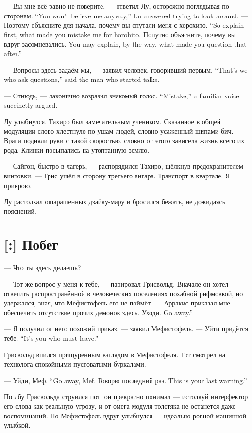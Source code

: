 {--- Вы мне всё равно не поверите, --- ответил Лу, осторожно поглядывая по сторонам.}
{``You won't believe me anyway,'' Lu answered trying to look around.}
{--- Поэтому объясните для начала, почему вы спутали меня с хорохито.}
{``So explain first, what made you mistake me for horohito.}
{Попутно объясните, почему вы вдруг засомневались.}
{You may explain, by the way, what made you question that after.''}

{--- Вопросы здесь задаём мы, --- заявил человек, говоривший первым.}
{``That's we who ask questions,'' said the man who started talks.}

{--- Отнюдь, --- лаконично возразил знакомый голос.}
{``Mistake,'' a familiar voice succinctly argued.}

Лу улыбнулся.
Тахиро был замечательным учеником.
Сказанное в общей модуляции слово хлестнуло по ушам людей, словно усаженный шипами бич.
Враги подняли руки с такой скоростью, словно от этого зависела жизнь всего их рода.
Клинки посыпались на утоптанную землю.

--- Сайгон, быстро в лагерь, --- распорядился Тахиро, щёлкнув предохранителем винтовки.
--- Грис ушёл в сторону третьего ангара.
Транспорт в квартале.
Я прикрою.

Лу растолкал ошарашенных дзайку-мару и бросился бежать, не дожидаясь пояснений.

\section{[:] Побег}

\textspace

--- Что ты здесь делаешь?

--- Тот же вопрос у меня к тебе, --- парировал Грисвольд.
Вначале он хотел ответить распространённой в человеческих поселениях похабной рифмовкой, но удержался, зная, что Мефистофель его не поймёт.
--- Арракис приказал мне обеспечить отсутствие прочих демонов здесь.
{Уходи.}
{Go away.''}

--- Я получил от него похожий приказ, --- заявил Мефистофель.
{--- Уйти придётся тебе.}
{``It's you who must leave.''}

Грисвольд впился прищуренным взглядом в Мефистофеля.
Тот смотрел на технолога спокойными пустоватыми буркалами.

{--- Уйди, Меф.}
{``Go away, Mef.}
{Говорю последний раз.}
{This is your last warning.''}

По лбу Грисвольда струился пот;
он прекрасно понимал --- истолкуй интерфектор его слова как реальную угрозу, и от омега-модуля толстяка не останется даже воспоминаний.
Но Мефистофель вдруг улыбнулся --- идеально ровной машинной улыбкой.

